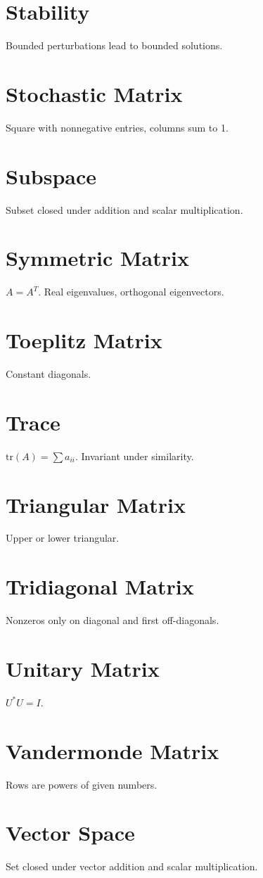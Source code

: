 \documentclass[12pt]{book}
\begin{document}
\chapter{Stability}
Bounded perturbations lead to bounded solutions.

\chapter{Stochastic Matrix}
Square with nonnegative entries, columns sum to 1.

\chapter{Subspace}
Subset closed under addition and scalar multiplication.

\chapter{Symmetric Matrix}
$A=A^T$. Real eigenvalues, orthogonal eigenvectors.

\chapter{Toeplitz Matrix}
Constant diagonals.

\chapter{Trace}
$\mathrm{tr}(A)=\sum a_{ii}$. Invariant under similarity.

\chapter{Triangular Matrix}
Upper or lower triangular.

\chapter{Tridiagonal Matrix}
Nonzeros only on diagonal and first off-diagonals.

\chapter{Unitary Matrix}
$U^*U=I$.

\chapter{Vandermonde Matrix}
Rows are powers of given numbers.

\chapter{Vector Space}
Set closed under vector addition and scalar multiplication.

\backmatter
\end{document}
